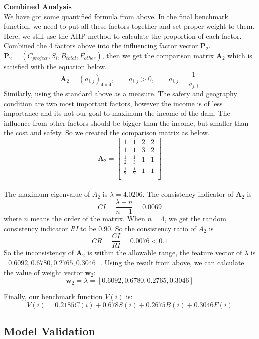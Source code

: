 \documentclass{mcmthesis}
\begin{document}
\textbf{Combined Analysis}\\
\indent We have got some quantified formula from above. In the final benchmark function, we need to put all these factors together and set proper weight to them. Here, we still use the AHP method to calculate the proportion of each factor. Combined the 4 factors above into the influencing factor vector $\textbf{P}_2$. $\textbf{P}_2 = (C_{project}, S_{i}, B_{total}, F_{other})$, then we get the comparison matrix $\textbf{A}_2$ which is satisfied with the equation below.
\[\textbf{A}_2 = (a_{i,j})_{4\times4}, \qquad a_{i,j}>0, \qquad a_{i,j} = \frac{1}{a_{j,i}}\]
\indent Similarly, using the standard above as a measure. The safety and geography condition are two most important factors, however the income is of less importance and its not our goal to maximum the income of the dam. The influence from other factors should be bigger than the income, but smaller than the cost and safety. So we created the comparison matrix as below.
\[\textbf{A}_2 =
\left[
\begin{matrix}
1 & 1 & 2 & 2 \\
1 & 1 & 3 & 2 \\
\frac{1}{2}& \frac{1}{3} & 1 & 1 \\
\frac{1}{2} & \frac{1}{2} & 1 & 1 \\
\end{matrix}
\right]
\]\\
The maximum eigenvalue of $A_{2}$ is $\lambda = 4.0206$. The consistency indicator of $\textbf{A}_2$ is \[\mathit{CI} = \frac{\lambda - n}{n - 1} = 0.0069\]
where $n$ means the order of the matrix. When $n = 4$, we get the random consistency indicator  \textit{RI} to be $0.90$. So the consistency ratio of $A_{2}$ is \[\mathit{CR} = \frac{\mathit{CI}}{\mathit{RI}} = 0.0076 < 0.1 \]
So the inconsistency of $\textbf{A}_2$ is within the allowable range, the feature vector of $\lambda$ is $\left[0.6092, 0.6780, 0.2765, 0.3046\right]$.
\indent Using the result from above, we can calculate the value of weight vector $\textbf{w}_{2}$:
\begin{equation}
\textbf{w}_{2} = \lambda = \left[0.6092, 0.6780, 0.2765, 0.3046\right]
\end{equation}

\indent Finally, our benchmark function $V(i)$ is:
\begin{equation}
V(i) = 0.2185C(i) + 0.678S(i) + 0.2675B(i) + 0.3046F(i)
\end{equation}


\subsection{Model Validation}
\end{document}

